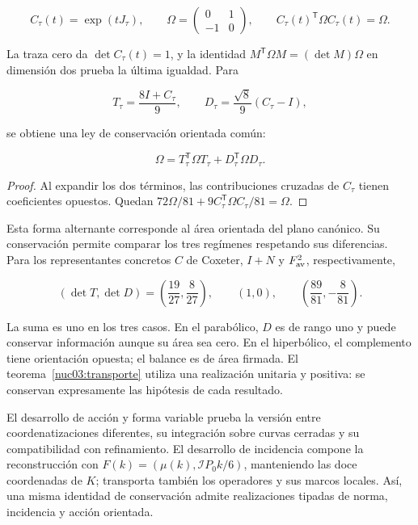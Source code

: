 \[
C_\tau(t)=\exp(tJ_\tau),\qquad
\Omega=\begin{pmatrix}0&1\\-1&0\end{pmatrix},\qquad
C_\tau(t)^\mathsf T\Omega C_\tau(t)=\Omega.
\]

La traza cero da \(\det C_\tau(t)=1\), y la identidad \(M^\mathsf T\Omega M=(\det M)\Omega\) en dimensión dos prueba la última igualdad. Para

\[
T_\tau=\frac{8I+C_\tau}{9},\qquad
D_\tau=\frac{\sqrt8}{9}(C_\tau-I),
\]

se obtiene una ley de conservación orientada común:

\begin{equation}
\boxed{\Omega=T_\tau^\mathsf T\Omega T_\tau+D_\tau^\mathsf T\Omega D_\tau.}
\label{nuc03:eq:22}
\end{equation}

\begin{proof}
Al expandir los dos términos, las contribuciones cruzadas de \(C_\tau\) tienen coeficientes opuestos. Quedan \(72\Omega/81+9C_\tau^\mathsf T\Omega C_\tau/81=\Omega\).
\end{proof}

Esta forma alternante corresponde al área orientada del plano canónico. Su conservación permite comparar los tres regímenes respetando sus diferencias. Para los representantes concretos \(C\) de Coxeter, \(I+N\) y \(F_{\rm av}^2\), respectivamente,

\begin{equation}
(\det T,\det D)=
\left(\frac{19}{27},\frac8{27}\right),\qquad
(1,0),\qquad
\left(\frac{89}{81},-\frac8{81}\right).
\label{nuc03:eq:23}
\end{equation}

La suma es uno en los tres casos. En el parabólico, \(D\) es de rango uno y puede conservar información aunque su área sea cero. En el hiperbólico, el complemento tiene orientación opuesta; el balance es de área firmada. El teorema~\ref{nuc03:transporte} utiliza una realización unitaria y positiva: se conservan expresamente las hipótesis de cada resultado.

El desarrollo de acción y forma variable prueba la versión entre coordenatizaciones diferentes, su integración sobre curvas cerradas y su compatibilidad con refinamiento. El desarrollo de incidencia compone la reconstrucción con \(F(k)=(\mu(k),\mathcal I P_0k/6)\), manteniendo las doce coordenadas de \(K\); transporta también los operadores y sus marcos locales. Así, una misma identidad de conservación admite realizaciones tipadas de norma, incidencia y acción orientada.
